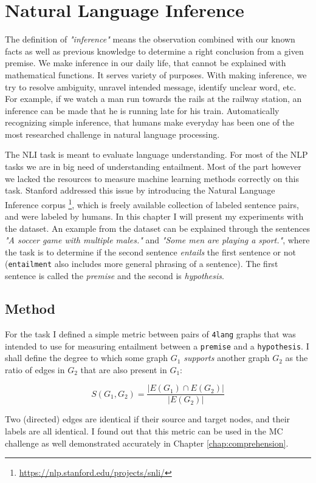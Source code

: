 \chapter{Natural Language Inference}
\label{chap:nli}
The definition of \textit{"inference"} means the observation combined with our known facts as well as previous knowledge to determine a right conclusion from a given premise. We make inference in our daily life, that cannot be explained with mathematical functions. It serves variety of purposes. With making inference, we try to resolve ambiguity, unravel intended message, identify unclear word, etc. For example, if we watch a man run towards the rails at the railway station, an inference can be made that he is running late for his train. Automatically recognizing simple inference, that humans make everyday has been one of the most researched challenge in natural language processing.

The NLI task is meant to evaluate language understanding. 
For most of the NLP tasks we are in big need of understanding entailment. Most of the part however we lacked the resources to measure machine learning methods correctly on this task. Stanford addressed this issue by introducing the Natural Language Inference corpus \footnote{\url{https://nlp.stanford.edu/projects/snli/}}, which is freely available collection of labeled sentence pairs, and were labeled by humans. In this chapter I will present my experiments with the dataset. An example from the dataset can be explained through the sentences \textit{"A soccer game with multiple males."} and 
\textit{"Some men are playing a sport."}, where the task is to determine if the second sentence \textit{entails} the first sentence or not (\texttt{entailment} also includes more general phrasing of a sentence). The first sentence is called the \textit{premise} and the second is \textit{hypothesis}.

\section{Method}
For the task I defined a simple metric between pairs of \texttt{4lang} graphs that
was intended to use for measuring entailment between a \texttt{premise} and a
\texttt{hypothesis}. I shall define the degree to which some graph $G_1$
\textit{supports} another graph $G_2$ as the ratio of edges in $G_2$
that are also present in $G_1$:

\[ S(G_1, G_2) =\frac{|E(G_1)\cap E(G_2)|}{|E(G_2)|}\]

Two (directed) edges are identical if their source
and target nodes, and their labels are all identical. I found out that this metric can be used in the MC challenge as well demonstrated accurately in Chapter \ref{chap:comprehension}.

